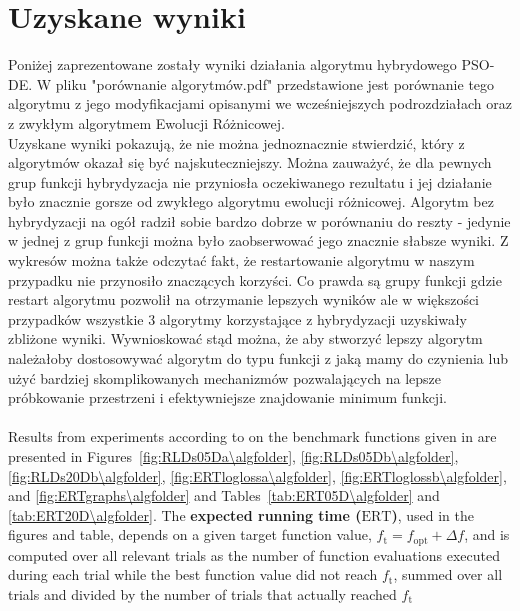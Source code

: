 \documentclass{article}
\newcommand{\ERT}{\ensuremath{\mathrm{ERT}}}
\newcommand{\Df}{\ensuremath{\Delta f}}
\newcommand{\fopt}{\ensuremath{f_\mathrm{opt}}}
\newcommand{\ftarget}{\ensuremath{f_\mathrm{t}}}
\begin{document}
\section{Uzyskane wyniki}
Poniżej zaprezentowane zostały wyniki działania algorytmu hybrydowego PSO-DE. W pliku "porównanie algorytmów.pdf" przedstawione jest porównanie tego algorytmu z jego modyfikacjami opisanymi we wcześniejszych podrozdziałach oraz z zwykłym algorytmem Ewolucji Różnicowej.\\
Uzyskane wyniki pokazują, że nie można jednoznacznie stwierdzić, który z algorytmów okazał się być najskuteczniejszy. Można zauważyć, że dla pewnych grup funkcji hybrydyzacja nie przyniosła oczekiwanego rezultatu i jej działanie było znacznie gorsze od zwykłego algorytmu ewolucji różnicowej. Algorytm bez hybrydyzacji na ogół radził sobie bardzo dobrze w porównaniu do reszty -  jedynie w jednej z grup funkcji można było zaobserwować jego znacznie słabsze wyniki. Z wykresów można także odczytać fakt, że restartowanie algorytmu w naszym przypadku nie przynosiło znaczących korzyści. Co prawda są grupy funkcji gdzie restart algorytmu pozwolił na otrzymanie lepszych wyników ale w większości przypadków wszystkie 3 algorytmy korzystające z hybrydyzacji uzyskiwały zbliżone wyniki. Wywnioskować stąd można, że aby stworzyć lepszy algorytm należałoby dostosowywać algorytm do typu funkcji z jaką mamy do czynienia lub użyć bardziej skomplikowanych mechanizmów pozwalających na lepsze próbkowanie przestrzeni i efektywniejsze znajdowanie minimum funkcji.\\
\\
Results from experiments according to \cite{hansen2010exp} on the
benchmark functions given in \cite{wp200901_2010,hansen2010fun} are presented
in Figures~\ref{fig:RLDs05Da\algfolder}, \ref{fig:RLDs05Db\algfolder},
\ref{fig:RLDs20Db\algfolder},
\ref{fig:ERTloglossa\algfolder}, \ref{fig:ERTloglossb\algfolder},
and \ref{fig:ERTgraphs\algfolder} and 
Tables~\ref{tab:ERT05D\algfolder} and \ref{tab:ERT20D\algfolder}.
The \textbf{expected running time (\ERT)}, used in the figures and table,
depends on a given target function value, $\ftarget=\fopt+\Df$, and is computed
over all relevant trials as the number of function evaluations executed during
each trial while the best function value did not reach \ftarget, summed over
all trials and divided by the number of trials that actually reached \ftarget\
\end{document}
